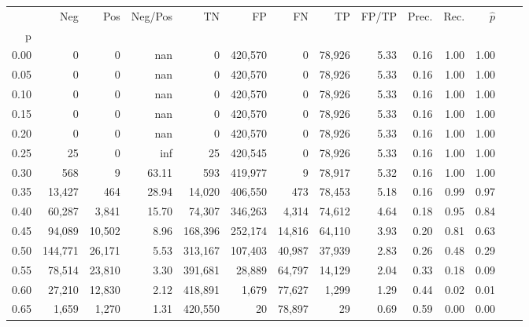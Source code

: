 \begin{tabular}{rrrrrrrrrrrrrr}
\toprule
{} &      Neg &     Pos & Neg/Pos &       TN &       FP &      FN &      TP & FP/TP & Prec. &  Rec. & $\hat{p}$ \\
p    &          &         &         &          &          &         &         &       &       &       &           \\
\midrule
0.00 &        0 &       0 &     nan &        0 &  420,570 &       0 &  78,926 &  5.33 &  0.16 &  1.00 &      1.00 \\
0.05 &        0 &       0 &     nan &        0 &  420,570 &       0 &  78,926 &  5.33 &  0.16 &  1.00 &      1.00 \\
0.10 &        0 &       0 &     nan &        0 &  420,570 &       0 &  78,926 &  5.33 &  0.16 &  1.00 &      1.00 \\
0.15 &        0 &       0 &     nan &        0 &  420,570 &       0 &  78,926 &  5.33 &  0.16 &  1.00 &      1.00 \\
0.20 &        0 &       0 &     nan &        0 &  420,570 &       0 &  78,926 &  5.33 &  0.16 &  1.00 &      1.00 \\
0.25 &       25 &       0 &     inf &       25 &  420,545 &       0 &  78,926 &  5.33 &  0.16 &  1.00 &      1.00 \\
0.30 &      568 &       9 &   63.11 &      593 &  419,977 &       9 &  78,917 &  5.32 &  0.16 &  1.00 &      1.00 \\
0.35 &   13,427 &     464 &   28.94 &   14,020 &  406,550 &     473 &  78,453 &  5.18 &  0.16 &  0.99 &      0.97 \\
0.40 &   60,287 &   3,841 &   15.70 &   74,307 &  346,263 &   4,314 &  74,612 &  4.64 &  0.18 &  0.95 &      0.84 \\
0.45 &   94,089 &  10,502 &    8.96 &  168,396 &  252,174 &  14,816 &  64,110 &  3.93 &  0.20 &  0.81 &      0.63 \\
0.50 &  144,771 &  26,171 &    5.53 &  313,167 &  107,403 &  40,987 &  37,939 &  2.83 &  0.26 &  0.48 &      0.29 \\
0.55 &   78,514 &  23,810 &    3.30 &  391,681 &   28,889 &  64,797 &  14,129 &  2.04 &  0.33 &  0.18 &      0.09 \\
0.60 &   27,210 &  12,830 &    2.12 &  418,891 &    1,679 &  77,627 &   1,299 &  1.29 &  0.44 &  0.02 &      0.01 \\
0.65 &    1,659 &   1,270 &    1.31 &  420,550 &       20 &  78,897 &      29 &  0.69 &  0.59 &  0.00 &      0.00 \\

\end{tabular}
